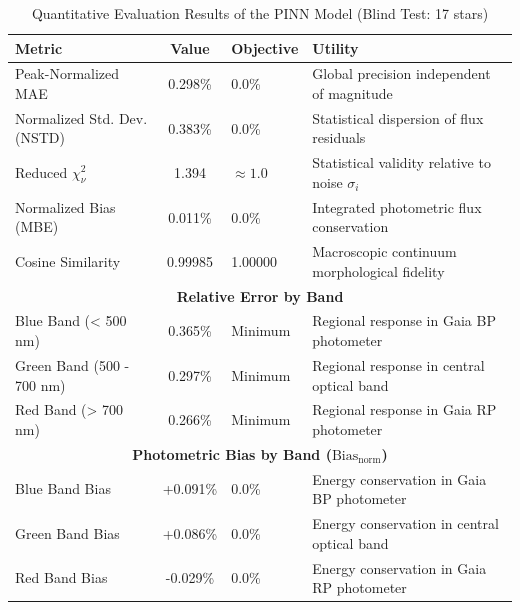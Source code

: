 
\begin{table}[htpb]
\centering
\caption{Quantitative Evaluation Results of the PINN Model (Blind Test: 17 stars)}
\label{tab:pinn_evaluation}
\begin{tabular}{lcll}
\hline
\textbf{Metric} & \textbf{Value} & \textbf{Objective} & \textbf{Utility} \\
\hline
Peak-Normalized MAE & 0.298\% & 0.0\% & Global precision independent of magnitude \\
Normalized Std. Dev. (NSTD) & 0.383\% & 0.0\% & Statistical dispersion of flux residuals \\
Reduced $\chi^2_\nu$ & 1.394 & $\approx 1.0$ & Statistical validity relative to noise $\sigma_i$ \\
Normalized Bias (MBE) & 0.011\% & 0.0\% & Integrated photometric flux conservation \\
Cosine Similarity & 0.99985 & 1.00000 & Macroscopic continuum morphological fidelity \\
\hline
\multicolumn{4}{c}{\textbf{Relative Error by Band}} \\
\hline
Blue Band (< 500 nm) & 0.365\% & Minimum & Regional response in Gaia BP photometer \\
Green Band (500 - 700 nm) & 0.297\% & Minimum & Regional response in central optical band \\
Red Band (> 700 nm) & 0.266\% & Minimum & Regional response in Gaia RP photometer \\
\hline
\multicolumn{4}{c}{\textbf{Photometric Bias by Band ($\text{Bias}_{\text{norm}}$)}} \\
\hline
Blue Band Bias & +0.091\% & 0.0\% & Energy conservation in Gaia BP photometer \\
Green Band Bias & +0.086\% & 0.0\% & Energy conservation in central optical band \\
Red Band Bias & -0.029\% & 0.0\% & Energy conservation in Gaia RP photometer \\
\hline
\end{tabular}
\end{table}
